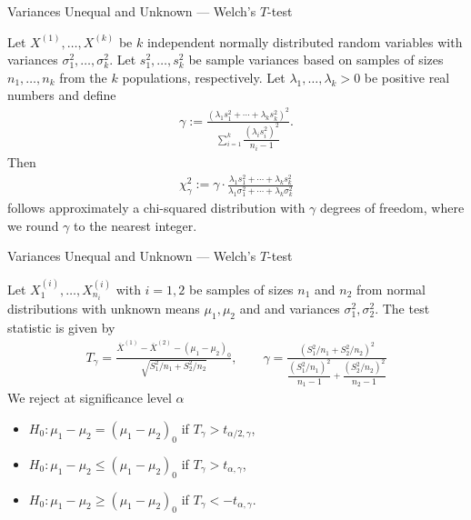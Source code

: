 \begin{frame}{Variances Unequal and Unknown --- Welch's $T$-test}

\justifying
{} Let $X^{(1)}, \ldots, X^{(k)}$ be $k$ independent normally distributed random variables with variances $\sigma_1^2, \ldots, \sigma_k^2$. Let $s_1^2, \ldots, s_k^2$ be sample variances based on samples of sizes $n_1, \ldots, n_k$ from the $k$ populations, respectively. Let $\lambda_1, \ldots, \lambda_k > 0$ be positive real numbers and define
\begin{align*}
\gamma := \frac{(\lambda_1 s_1^2 + \cdots + \lambda_k s_k^2)^2}{\displaystyle\sum_{i=1}^k \dfrac{(\lambda_i s_i^2)^2}{n_i-1} }.
\end{align*}
Then
\begin{align*}
\chi_{\gamma}^2 := \gamma \cdot \frac{\lambda_1 s_1^2 + \cdots + \lambda_k s_k^2}{\lambda_1 \sigma_1^2 + \cdots + \lambda_k \sigma_k^2}
\end{align*}
follows approximately a chi-squared distribution with $\gamma$ degrees of freedom, where we round $\gamma$  to the nearest integer.


\end{frame}


\begin{frame}{Variances Unequal and Unknown --- Welch's $T$-test}

\justifying
{} Let $X_1^{(i)}, \ldots, X_{n_i}^{(i)}$ with $i = 1, 2$ be samples of sizes $n_1$ and $n_2$ from normal distributions with unknown means $\mu_1, \mu_2$ and  and  variances $\sigma_1^2, \sigma_2^2$. The test statistic is given by
\begin{align*}
T_{\gamma} = \frac{\overline{X}^{(1)} - \overline{X}^{(2)} - (\mu_1-\mu_2)_0}{\sqrt{S_1^2/n_1 + S_2^2/n_2}}, \qquad \gamma = \frac{(S_1^2/n_1 + S_2^2/n_2)^2}{\dfrac{(S_1^2/n_1)^2}{n_1-1} + \dfrac{(S_2^2/n_2)^2}{n_2-1}}
\end{align*}
We reject at significance level $\alpha$
\begin{itemize}
	\item $H_0: \mu_1-\mu_2 = (\mu_1-\mu_2)_0$ if $T_{\gamma} > t_{\alpha/2,\gamma}$,
	\item $H_0: \mu_1-\mu_2 \leq (\mu_1-\mu_2)_0$ if $T_{\gamma} > t_{\alpha,\gamma}$,
	\item $H_0: \mu_1-\mu_2 \geq (\mu_1-\mu_2)_0$ if $T_{\gamma} < -t_{\alpha,\gamma}$.
\end{itemize}



\end{frame}


